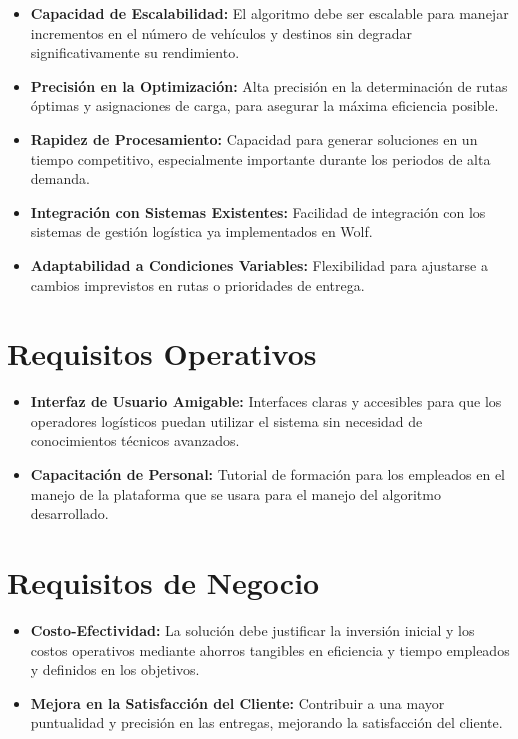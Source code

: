 \documentclass[11pt,a4paper,spanish]{book}
\begin{document}
\begin{itemize}
	\item \textbf{Capacidad de Escalabilidad:} El algoritmo debe ser escalable para manejar incrementos en el número de vehículos y destinos sin degradar significativamente su rendimiento.
	\item \textbf{Precisión en la Optimización:} Alta precisión en la determinación de rutas óptimas y asignaciones de carga, para asegurar la máxima eficiencia posible.
	\item \textbf{Rapidez de Procesamiento:} Capacidad para generar soluciones en un tiempo competitivo, especialmente importante durante los periodos de alta demanda.
	\item \textbf{Integración con Sistemas Existentes:} Facilidad de integración con los sistemas de gestión logística ya implementados en Wolf.
	\item \textbf{Adaptabilidad a Condiciones Variables:} Flexibilidad para ajustarse a cambios imprevistos en rutas o prioridades de entrega.
\end{itemize}

\section{Requisitos Operativos}

\begin{itemize}
	\item \textbf{Interfaz de Usuario Amigable:} Interfaces claras y accesibles para que los operadores logísticos puedan utilizar el sistema sin necesidad de conocimientos técnicos avanzados.
	\item \textbf{Capacitación de Personal:} Tutorial de formación para los empleados en el manejo de la plataforma que se usara para el manejo del algoritmo desarrollado.
\end{itemize}

\section{Requisitos de Negocio}

\begin{itemize}
	\item \textbf{Costo-Efectividad:} La solución debe justificar la inversión inicial y los costos operativos mediante ahorros tangibles en eficiencia y tiempo empleados y definidos en los objetivos.
	\item \textbf{Mejora en la Satisfacción del Cliente:} Contribuir a una mayor puntualidad y precisión en las entregas, mejorando la satisfacción del cliente.

\end{itemize}
\end{document}
